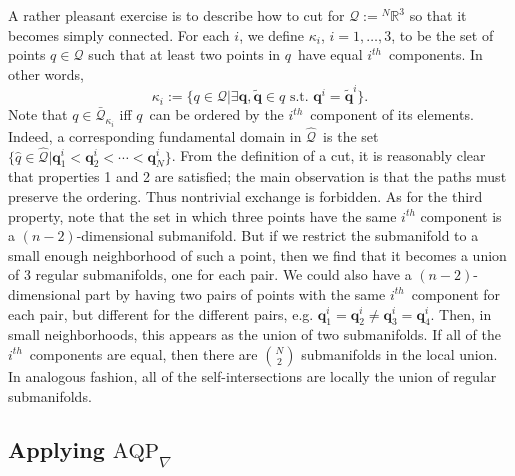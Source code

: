 \documentclass[11pt]{article}
\theoremstyle{remark}
\begin{document}
A rather pleasant exercise  is to 
describe how to cut for $\ensuremath{\mathcal{Q}} \ensuremath{:=} \ensuremath{{}^N\ensuremath{\mathbb{R}^{\ensuremath{3}}}}$ so that it becomes simply
connected.  
For each $i$, we define $\ensuremath{\kappa}_i$, $i=1,\dotsc,\ensuremath{3}$, to
be the set of points $\ensuremath{q} \in \ensuremath{\mathcal{Q}}$ such that at least two points
in \ensuremath{q}\ have equal  $\ensuremath{{i}^{th}}$\  components. In other words, 
\begin{equation*}
\ensuremath{\kappa}_i \ensuremath{:=} \{ \ensuremath{q} \in \ensuremath{\mathcal{Q}}| \exists \ensuremath{\boldsymbol{q}}, \tilde{\ensuremath{\boldsymbol{q}}} \in \ensuremath{q}
\text{ s.t. } \ensuremath{\boldsymbol{q}}^i =\tilde{\ensuremath{\boldsymbol{q}}}^i\}.
\end{equation*} 
Note that $\ensuremath{q} \in \ensuremath{\bar{\ensuremath{\mathcal{Q}}}_{{\ensuremath{\kappa}_i}}}$ iff \ensuremath{q}\ can be ordered
by the $\ensuremath{{i}^{th}}$\ component of its
elements. 
Indeed, a corresponding fundamental domain in \ensuremath{\widehat{\ensuremath{\mathcal{Q}}}}\ is the set
$\{\ensuremath{\hat{q}} \in \ensuremath{\widehat{\ensuremath{\mathcal{Q}}}}| \ensuremath{\boldsymbol{q}}_1^i < \ensuremath{\boldsymbol{q}}_2^i < \cdots < \ensuremath{\boldsymbol{q}}_{N}^i
\}$. From the definition of a cut, it is reasonably clear that
properties 1 and 2 are satisfied;  the main observation is that
the paths must preserve the ordering. Thus nontrivial exchange is
forbidden. As for the third property, note that the set in which
three points have the same $\ensuremath{{i}^{th}}$ component is a
$(n-2)$-dimensional submanifold. But if we restrict the submanifold to
 a small enough
neighborhood of such a
point, then we find that it becomes a union of 3 regular submanifolds, 
one for each
pair. We could also have a $(n-2)$-dimensional part by having two
pairs of points with the same $\ensuremath{{i}^{th}}$\ component for each pair, but
different for the different pairs, e.g. $\ensuremath{\boldsymbol{q}}_1^i = \ensuremath{\boldsymbol{q}}_2^i \neq
\ensuremath{\boldsymbol{q}}_3^i = \ensuremath{\boldsymbol{q}}_4^i$. Then, in small neighborhoods, this
appears as the union of two submanifolds. If all of the $\ensuremath{{i}^{th}}$\
components are 
equal, then there are $\binom{N}{2}$ submanifolds in the local union. 
In analogous fashion, all of the self-intersections are locally the
union of regular submanifolds. 


\subsection{Applying \ensuremath{\text{AQP}_{\nabla}}}
\end{document}
